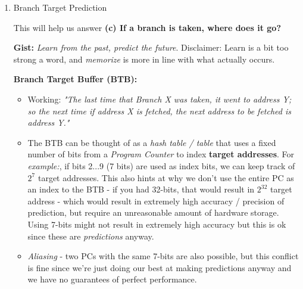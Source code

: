 \documentclass[12pt]{article}
\newenvironment{QandA}{\begin{enumerate}[label=\bfseries\arabic*.]\bfseries}
                      {\end{enumerate}}
\newenvironment{answered}{\par\quad\normalfont}{}
\begin{document}
\begin{QandA}
\begin{answered}
A structure called the \textbf{Branch Target Buffer (BTB)} will be used to answer part (a) and (c) of our problem above. 

A \textbf{Direction Predictor} structure will be used to answer (b). Historically, part (b) is the most challenging part of this problem and is most often associated with literature on \textit{dynamic branch prediction}.

Things to keep in mind while navigating through the mess that is \textit{branch prediction}:
\begin{itemize}
    \item Which instruction are we trying to make predictions about? The instruction \textbf{ahead} of us in the pipeline; and this is recursively applied. 
    \item Our notion of PC must now account for this since there are 5 instructions in the pipeline and they all have \textit{Program Counters}. 
\end{itemize}

\end{answered}

\ 

\item Branch Target Prediction
\begin{answered}
This will help us answer \textbf{(c) If a branch is taken, where does it go?}

\textbf{Gist:} \textit{Learn from the past, predict the future}. Disclaimer: Learn is a bit too strong a word, and \textit{memorize} is more in line with what actually occurs.

\textbf{Branch Target Buffer (BTB):}
\begin{itemize}
    \item Working: \textit{"The last time that Branch X was taken, it went to address Y; so the next time if address X is fetched, the next address to be fetched is address Y."}
    \item The BTB can be thought of as a \textit{hash table / table} that uses a fixed number of bits from a \textit{Program Counter} to index \textbf{target addresses}. For \textit{example:}, if bits 2$...$9 (7 bits) are used as index bits, we can keep track of $2^{7}$ target addresses. This also hints at why we don't use the entire PC as an index to the BTB - if you had 32-bits, that would result in $2^{32}$ target address - which would result in extremely high accuracy / precision of prediction, but require an unreasonable amount of hardware storage. Using 7-bits might not result in extremely high accuracy but this is ok since these are \textit{predictions} anyway.
    \item \textit{Aliasing} - two PCs with the same 7-bits are also possible, but this conflict is fine since we're just doing our best at making predictions anyway and we have no guarantees of perfect performance.
\end{itemize}


\end{answered}
\end{QandA}
\end{document}
